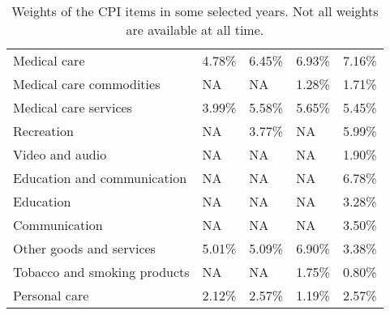 \documentclass[12pt]{article}
\begin{document}
\begin{adjustwidth}{-2cm}{}
\begin{table}
\begin{tabular}{lllll}
\hspace*{4ex}Medical care & 4.78\% & 6.45\% & 6.93\% & 7.16\% \\
\hspace*{8ex}Medical care commodities & NA & NA & 1.28\% & 1.71\% \\
\hspace*{8ex}Medical care services & 3.99\% & 5.58\% & 5.65\% & 5.45\% \\
\hspace*{4ex}Recreation & NA & 3.77\% & NA & 5.99\% \\
\hspace*{8ex}Video and audio & NA & NA & NA & 1.90\% \\
\hspace*{4ex}Education and communication & NA & NA & NA & 6.78\% \\
\hspace*{8ex}Education & NA & NA & NA & 3.28\% \\
\hspace*{8ex}Communication & NA & NA & NA & 3.50\% \\
\hspace*{4ex}Other goods and services & 5.01\% & 5.09\% & 6.90\% & 3.38\% \\
\hspace*{8ex}Tobacco and smoking products & NA & NA & 1.75\% & 0.80\% \\
\hspace*{8ex}Personal care & 2.12\% & 2.57\% & 1.19\% & 2.57\% \\
\end{tabular}


\caption{Weights of the CPI items in some selected years. Not all weights are available at all time.}
\label{table:weights}
\end{table}
\end{adjustwidth}
\end{document}
